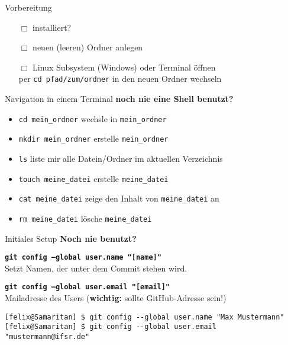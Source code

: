 \begin{frame}{Vorbereitung}
	\begin{itemize}
		\item [$\Box$] \git installiert?
		\item [$\Box$] neuen (leeren) Ordner anlegen
		\item [$\Box$] Linux Subsystem (Windows) oder Terminal öffnen \\
			per \alert{\texttt{cd pfad/zum/ordner}} in den neuen Ordner wechseln
	\end{itemize}
\end{frame}
\begin{frame}{Navigation in einem Terminal}
	\centering \textbf{noch nie eine Shell benutzt?}
	\pause
	\begin{itemize}
		\item \alert{\texttt{cd mein\_ordner}} wechsle in \texttt{mein\_ordner}
		\item \alert{\texttt{mkdir mein\_ordner}} erstelle \texttt{mein\_ordner}
		\item \alert{\texttt{ls}} liste mir alle Datein/Ordner im aktuellen Verzeichnis
		\item \alert{\texttt{touch meine\_datei}} erstelle \texttt{meine\_datei}
		\item \alert{\texttt{cat meine\_datei}} zeige den Inhalt von \texttt{meine\_datei} an
		\item \alert{\texttt{rm meine\_datei}} lösche \texttt{meine\_datei}
	\end{itemize}
\end{frame}
\begin{frame}[fragile]{Initiales Setup}
	\centering \textbf{Noch nie \git benutzt?}
	\vfill
	\pause{}
	
	\centering \large \textbf{\alert{\texttt{git config --global user.name "[name]"}}} \\[.2cm]
	\normalsize Setzt Namen, der unter dem Commit stehen wird.
	
	\vfill
	\pause{}
	
	\large \textbf{\alert{\texttt{git config --global user.email "[email]"}}} \\[.2cm]
	\normalsize Mailadresse des Users (\textbf{wichtig:} sollte GitHub-Adresse sein!)
	
	\vfill
	\pause{}
	
	\begin{lstlisting}[basicstyle=\scriptsize\ttfamily]
[felix@Samaritan] $ git config --global user.name "Max Mustermann"
[felix@Samaritan] $ git config --global user.email "mustermann@ifsr.de"
\end{lstlisting}
\end{frame}

